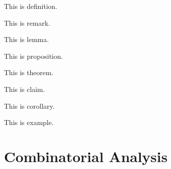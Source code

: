 \documentclass{huhtakm-template-book}
\begin{document}
\begin{defn}
	This is definition.
\end{defn}
\begin{rem}
	This is remark.
\end{rem}
\begin{lem}
	This is lemma.
\end{lem}
\begin{prop}
	This is proposition.
\end{prop}
\begin{thm}
	This is theorem.
\end{thm}
\begin{cla}
	This is claim.
\end{cla}
\begin{cor}
	This is corollary.
\end{cor}
\begin{eg}
	This is example.
\end{eg}
\tableofcontents
\chapter{Combinatorial Analysis}
\end{document}
